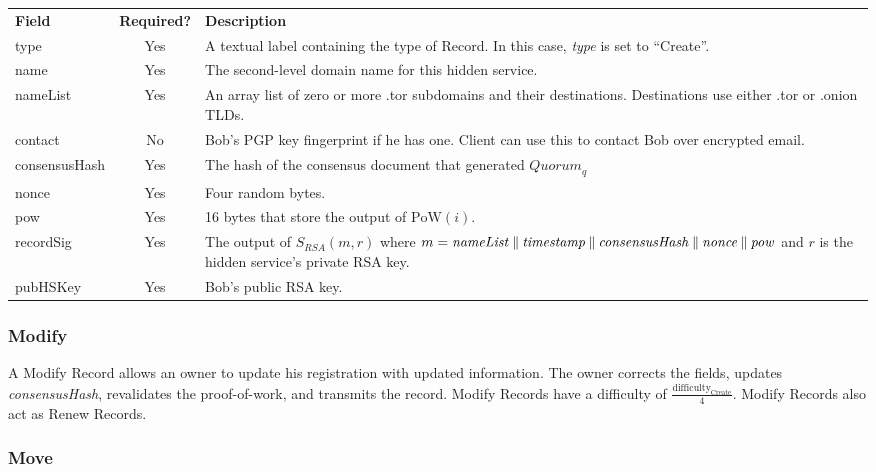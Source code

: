 \renewcommand{\arraystretch}{1.75} %
\begin{center}
    \begin{longtabu}{ | l | c | p{9.5cm} |}
    \hline
    \textbf{Field} & \textbf{Required?} & \textbf{Description} \\
    type & Yes & A textual label containing the type of Record. In this case, \emph{type} is set to ``Create''. \\
    name & Yes & The second-level domain name for this hidden service. \\
    nameList & Yes & An array list of zero or more .tor subdomains and their destinations. Destinations use either .tor or .onion TLDs. \\
    contact & No & Bob's PGP key fingerprint if he has one. Client can use this to contact Bob over encrypted email. \\
    consensusHash & Yes & The hash of the consensus document that generated $ \mathit{Quorum}_{q} $ \\
    nonce & Yes & Four random bytes. \\
   	pow & Yes & 16 bytes that store the output of $ \mathrm{PoW}(i) $. \\
   	recordSig & Yes & The output of $ S_{\mathit{RSA}}(m, r) $ where $ m = \mathit{nameList} \mathbin{\|} \mathit{timestamp} \mathbin{\|} \mathit{consensusHash} \mathbin{\|} \mathit{nonce} \mathbin{\|} \mathit{pow} $ and $ r $ is the hidden service's private RSA key. \\
   	pubHSKey & Yes & Bob's public RSA key. \\
    \hline
    \end{longtabu}
\end{center}

\subsubsection{Modify}

A Modify Record allows an owner to update his registration with updated information. The owner corrects the fields, updates \emph{consensusHash}, revalidates the proof-of-work, and transmits the record. Modify Records have a difficulty of $ \frac{\textrm{difficulty}_{\textrm{Create}}}{4} $. Modify Records also act as Renew Records. 

\subsubsection{Move}

